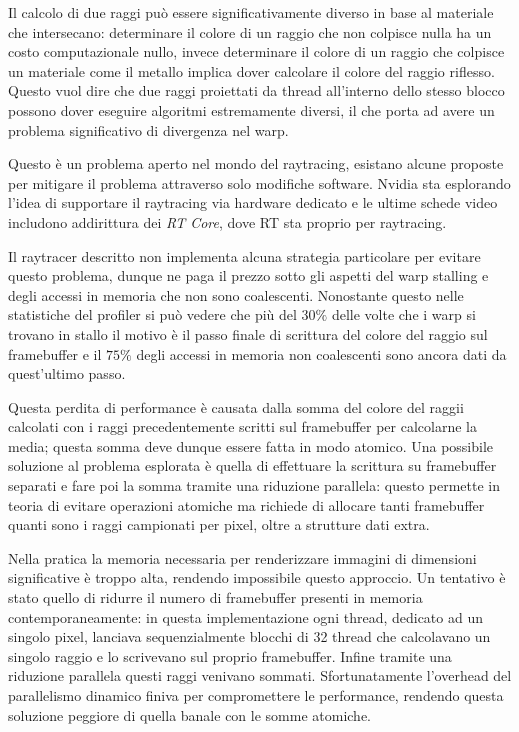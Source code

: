 \documentclass[12pt, twoside]{article}
\begin{document}
Il calcolo di due raggi può essere significativamente diverso in base al
materiale che intersecano: determinare il colore di un raggio che non colpisce
nulla ha un costo computazionale nullo, invece determinare il colore di un
raggio che colpisce un materiale come il metallo implica dover calcolare il
colore del raggio riflesso.
Questo vuol dire che due raggi proiettati da thread all'interno dello stesso
blocco possono dover eseguire algoritmi estremamente diversi, il che porta
ad avere un problema significativo di divergenza nel warp.

Questo è un problema aperto nel mondo del raytracing, esistano alcune proposte
\cite{2011threadcompaction}\cite{2012simtmicroscheduling} per mitigare il
problema attraverso solo modifiche software.
Nvidia sta esplorando l'idea di supportare il raytracing via hardware
dedicato\cite{2022subwarpinterleaving} e le ultime schede video
includono addirittura dei \textit{RT Core}\cite{2018rtcores}, dove RT sta
proprio per raytracing.

Il raytracer descritto non implementa alcuna strategia particolare per evitare
questo problema, dunque ne paga il prezzo sotto gli aspetti del warp stalling
e degli accessi in memoria che non sono coalescenti.
Nonostante questo nelle statistiche del profiler si può vedere che più del
$30\%$ delle volte che i warp si trovano in stallo il motivo è il passo finale
di scrittura del colore del raggio sul framebuffer e il $75\%$ degli
accessi in memoria non coalescenti sono ancora dati da quest'ultimo passo.

Questa perdita di performance è causata dalla somma del colore del raggii
calcolati con i raggi precedentemente scritti sul framebuffer per calcolarne
la media; questa somma deve dunque essere fatta in modo atomico.
Una possibile soluzione al problema esplorata è quella di effettuare la
scrittura su framebuffer separati e fare poi la somma tramite una riduzione
parallela: questo permette in teoria di evitare operazioni atomiche ma richiede
di allocare tanti framebuffer quanti sono i raggi campionati per pixel, oltre 
a strutture dati extra.

Nella pratica la memoria necessaria per renderizzare immagini di dimensioni
significative è troppo alta, rendendo impossibile questo approccio.
Un tentativo è stato quello di ridurre il numero di framebuffer presenti in
memoria contemporaneamente: in questa implementazione ogni thread, dedicato ad
un singolo pixel, lanciava sequenzialmente blocchi di 32 thread che calcolavano
un singolo raggio e lo scrivevano sul proprio framebuffer.
Infine tramite una riduzione parallela questi raggi venivano sommati.
Sfortunatamente l'overhead del parallelismo dinamico finiva per compromettere
le performance, rendendo questa soluzione peggiore di quella banale con le
somme atomiche.
\end{document}
